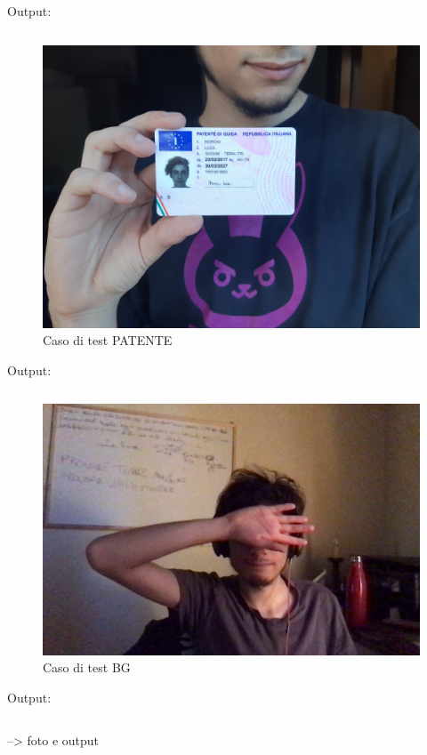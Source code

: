\documentclass[12pt,a4paper]{article}
\begin{document}
Output:
\inputminted{python}{test_tesserino.py}

\begin{figure}[H]
    \caption{Caso di test PATENTE}
    \centering
    \includegraphics[width=\textwidth,height=\textheight,keepaspectratio]{test_patente.jpg}
\end{figure}

Output:
\inputminted{python}{test_patente.py}

\begin{figure}[H]
    \caption{Caso di test BG}
    \centering
    \includegraphics[width=\textwidth,height=\textheight,keepaspectratio]{test_background.jpg}
\end{figure}

Output:
\inputminted{python}{test_background.py}
--> foto e output
\end{document}
